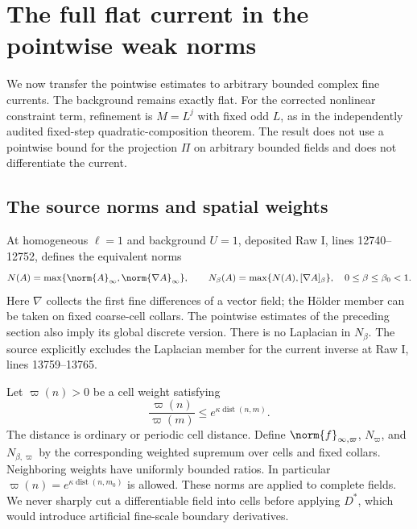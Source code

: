 \section{The full flat current in the pointwise weak norms}
\label{pc-section}

We now transfer the pointwise estimates to arbitrary bounded complex
fine currents. The background remains exactly flat. For the corrected
nonlinear constraint term, refinement is $M=L^j$ with fixed odd $L$,
as in the independently audited fixed-step quadratic-composition
theorem. The result does not use a pointwise bound for the projection
$\Pi$ on arbitrary bounded fields and does not differentiate the current.

\subsection{The source norms and spatial weights}

At homogeneous $\ell=1$ and background $U=1$, deposited Raw I,
lines 12740--12752, defines the equivalent norms
\begin{equation}\label{pc-source-norms}
 N(A)=\max\{\norm{A}_\infty,\norm{\nabla A}_\infty\},\qquad
 N_\beta(A)=\max\{N(A),[\nabla A]_\beta\},
 \quad 0\le\beta\le\beta_0<1.
\end{equation}
Here $\nabla$ collects the first fine differences of a vector field;
the H\"older member can be taken on fixed coarse-cell collars.
The pointwise estimates of the preceding section also imply its
global discrete version. There is no Laplacian in $N_\beta$.
The source explicitly excludes the Laplacian member for the current
inverse at Raw I, lines 13759--13765.

Let $\varpi(n)>0$ be a cell weight satisfying
\begin{equation}\label{pc-weight-ratio}
 \frac{\varpi(n)}{\varpi(m)}
       \le e^{\kappa\operatorname{dist}(n,m)}.
\end{equation}
The distance is ordinary or periodic cell distance. Define
$\norm{f}_{\infty,\varpi}$, $N_\varpi$, and $N_{\beta,\varpi}$
by the corresponding weighted supremum over cells and fixed collars.
Neighboring weights have uniformly bounded ratios. In particular
$\varpi(n)=e^{\kappa\operatorname{dist}(n,m_0)}$ is allowed.
These norms are applied to complete fields. We never sharply cut a
differentiable field into cells before applying $D^*$, which would
introduce artificial fine-scale boundary derivatives.

